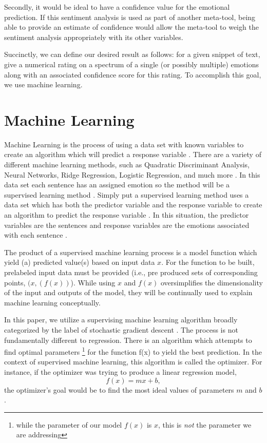 \documentclass[titlepage,letterpaper]{article}
\begin{document}
Secondly, it would be ideal to have a confidence value for the emotional prediction. If this sentiment analysis is used as part of another meta-tool, being able to provide an estimate of confidence would allow the meta-tool to weigh the sentiment analysis appropriately with its other variables.

Succinctly, we can define our desired result as follows: for a given snippet of text, give a numerical rating on a spectrum of a single (or possibly multiple) emotions along with an associated confidence score for this rating. To accomplish this goal, we use machine learning. 

\section{Machine Learning}

Machine Learning is the process of using a data set with known variables to create an algorithm which will predict a response variable \cite{Statlearning}. There are a variety of different machine learning methods, such as Quadratic Discriminant Analysis, Neural Networks, Ridge Regression, Logistic Regression, and much more \cite{Statlearning}. In this data set each sentence has an assigned emotion so the method will be a supervised learning method \cite{Statlearning}. Simply put a supervised learning method uses a data set which has both the predictor variable and the response variable to create an algorithm to predict the response variable \cite{Statlearning}. In this situation, the predictor variables are the sentences and response variables are the emotions associated with each sentence \cite{Statlearning}. 

    The product of a supervised machine learning process is a model function which yield (a) predicted value(s) based on input data $x$. For the function to be built, prelabeled input data must be provided (i.e., pre produced sets of corresponding points, $(x,(f(x))$). While using $x$ and $f(x)$ oversimplifies the dimensionality of the input and outputs of the model, they will be continually used to explain machine learning conceptually.

In this paper, we utilize a supervising machine learning algorithm broadly categorized by the label of stochastic gradient descent \cite{stoch}. The process is not fundamentally different to regression.  There is an algorithm which attempts to find optimal parameters \cite{regression} \footnote{while the parameter of our model $f(x)$ is $x$, this is \emph{not} the parameter we are addressing} for the function f(x) to yield the best prediction. In the context of supervised machine learning, this algorithm is called the optimizer. For instance, if the optimizer was trying to produce a linear regression model, 
\[f(x) = mx + b, \] the optimizer’s goal would be to find the most ideal values of parameters $m$ and $b$. 
\end{document}
